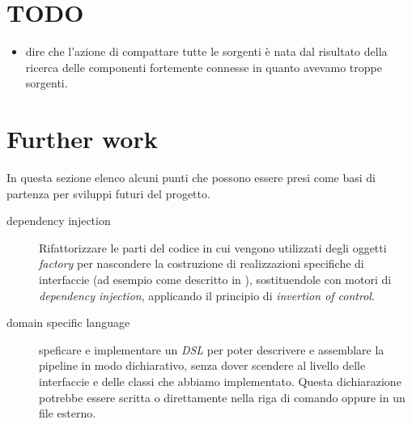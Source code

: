 
\section{TODO}
\begin{itemize}
\item dire che l'azione di compattare tutte le sorgenti \`e nata dal
  risultato della ricerca delle componenti fortemente connesse in
  quanto avevamo troppe sorgenti.
\end{itemize}

\section{Further work}

In questa sezione elenco alcuni punti che possono essere presi come
basi di partenza per sviluppi futuri del progetto. 

\begin{description}
\item[dependency injection] Rifattorizzare le parti del codice in cui
  vengono utilizzati degli oggetti \emph{factory} per nascondere la
  costruzione di realizzazioni specifiche di interfaccie (ad esempio
  come descritto in ),
  sostituendole con motori di \emph{dependency injection}, applicando
  il principio di \emph{invertion of control}.
\item[domain specific language] speficare e implementare un \emph{DSL}
  per poter descrivere e assemblare la pipeline in modo dichiarativo,
  senza dover scendere al livello delle interfaccie e delle classi che
  abbiamo implementato. Questa dichiarazione potrebbe essere scritta o
  direttamente nella riga di comando oppure in un file esterno.
\end{description}
